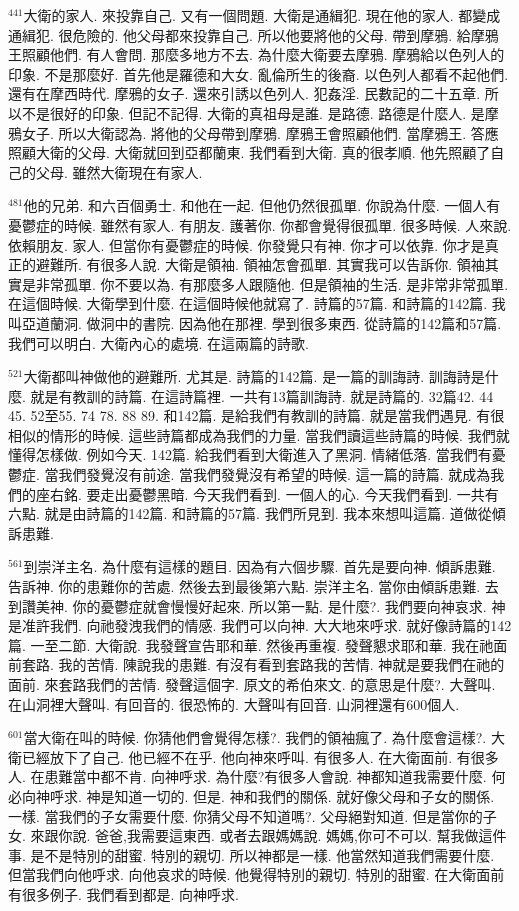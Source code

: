 \documentclass{book}
\begin{document}
$^{441}$大衛的家人.
來投靠自己.
又有一個問題.
大衛是通緝犯.
現在他的家人.
都變成通緝犯.
很危險的.
他父母都來投靠自己.
所以他要將他的父母.
帶到摩鴉.
給摩鴉王照顧他們.
有人會問.
那麼多地方不去.
為什麼大衛要去摩鴉.
摩鴉給以色列人的印象.
不是那麼好.
首先他是羅德和大女.
亂倫所生的後裔.
以色列人都看不起他們.
還有在摩西時代.
摩鴉的女子.
還來引誘以色列人.
犯姦淫.
民數記的二十五章.
所以不是很好的印象.
但記不記得.
大衛的真祖母是誰.
是路德.
路德是什麼人.
是摩鴉女子.
所以大衛認為.
將他的父母帶到摩鴉.
摩鴉王會照顧他們.
當摩鴉王.
答應照顧大衛的父母.
大衛就回到亞都蘭東.
我們看到大衛.
真的很孝順.
他先照顧了自己的父母.
雖然大衛現在有家人.

$^{481}$他的兄弟.
和六百個勇士.
和他在一起.
但他仍然很孤單.
你說為什麼.
一個人有憂鬱症的時候.
雖然有家人.
有朋友.
護著你.
你都會覺得很孤單.
很多時候.
人來說.
依賴朋友.
家人.
但當你有憂鬱症的時候.
你發覺只有神.
你才可以依靠.
你才是真正的避難所.
有很多人說.
大衛是領袖.
領袖怎會孤單.
其實我可以告訴你.
領袖其實是非常孤單.
你不要以為.
有那麼多人跟隨他.
但是領袖的生活.
是非常非常孤單.
在這個時候.
大衛學到什麼.
在這個時候他就寫了.
詩篇的57篇.
和詩篇的142篇.
我叫亞道蘭洞.
做洞中的書院.
因為他在那裡.
學到很多東西.
從詩篇的142篇和57篇.
我們可以明白.
大衛內心的處境.
在這兩篇的詩歌.

$^{521}$大衛都叫神做他的避難所.
尤其是.
詩篇的142篇.
是一篇的訓誨詩.
訓誨詩是什麼.
就是有教訓的詩篇.
在這詩篇裡.
一共有13篇訓誨詩.
就是詩篇的.
32篇42.
44 45.
52至55.
74 78.
88 89.
和142篇.
是給我們有教訓的詩篇.
就是當我們遇見.
有很相似的情形的時候.
這些詩篇都成為我們的力量.
當我們讀這些詩篇的時候.
我們就懂得怎樣做.
例如今天.
142篇.
給我們看到大衛進入了黑洞.
情緒低落.
當我們有憂鬱症.
當我們發覺沒有前途.
當我們發覺沒有希望的時候.
這一篇的詩篇.
就成為我們的座右銘.
要走出憂鬱黑暗.
今天我們看到.
一個人的心.
今天我們看到.
一共有六點.
就是由詩篇的142篇.
和詩篇的57篇.
我們所見到.
我本來想叫這篇.
道做從傾訴患難.

$^{561}$到崇洋主名.
為什麼有這樣的題目.
因為有六個步驟.
首先是要向神.
傾訴患難.
告訴神.
你的患難你的苦處.
然後去到最後第六點.
崇洋主名.
當你由傾訴患難.
去到讚美神.
你的憂鬱症就會慢慢好起來.
所以第一點.
是什麼?.
我們要向神哀求.
神是准許我們.
向祂發洩我們的情感.
我們可以向神.
大大地來呼求.
就好像詩篇的142篇.
一至二節.
大衛說.
我發聲宣告耶和華.
然後再重複.
發聲懇求耶和華.
我在祂面前套路.
我的苦情.
陳說我的患難.
有沒有看到套路我的苦情.
神就是要我們在祂的面前.
來套路我們的苦情.
發聲這個字.
原文的希伯來文.
的意思是什麼?.
大聲叫.
在山洞裡大聲叫.
有回音的.
很恐怖的.
大聲叫有回音.
山洞裡還有600個人.

$^{601}$當大衛在叫的時候.
你猜他們會覺得怎樣?.
我們的領袖瘋了.
為什麼會這樣?.
大衛已經放下了自己.
他已經不在乎.
他向神來呼叫.
有很多人.
在大衛面前.
有很多人.
在患難當中都不肯.
向神呼求.
為什麼?有很多人會說.
神都知道我需要什麼.
何必向神呼求.
神是知道一切的.
但是.
神和我們的關係.
就好像父母和子女的關係.
一樣.
當我們的子女需要什麼.
你猜父母不知道嗎?.
父母絕對知道.
但是當你的子女.
來跟你說.
爸爸,我需要這東西.
或者去跟媽媽說.
媽媽,你可不可以.
幫我做這件事.
是不是特別的甜蜜.
特別的親切.
所以神都是一樣.
他當然知道我們需要什麼.
但當我們向他呼求.
向他哀求的時候.
他覺得特別的親切.
特別的甜蜜.
在大衛面前有很多例子.
我們看到都是.
向神呼求.
\end{document}
